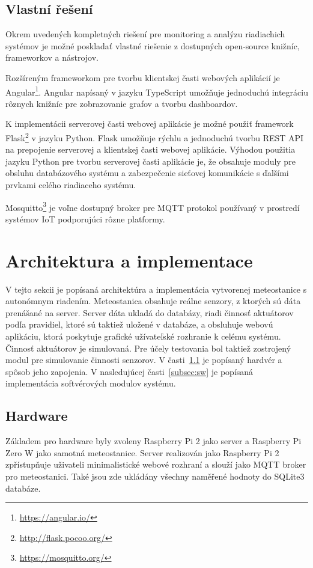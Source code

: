 \documentclass[11pt,a4paper]{article}
\begin{document}
\subsection{Vlastní řešení}
Okrem uvedených kompletných riešení pre monitoring a analýzu riadiachich systémov je možné poskladať vlastné riešenie
z dostupných open-source knižníc, frameworkov a nástrojov.

Rozšíreným frameworkom pre tvorbu klientskej časti webových aplikácií je Angular\footnote{\url{https://angular.io/}}.
Angular napísaný v jazyku TypeScript umožňuje jednoduchú integráciu rôznych knižníc pre zobrazovanie grafov a tvorbu dashboardov.

K implementácii serverovej časti webovej aplikácie je možné použiť framework Flask\footnote{\url{http://flask.pocoo.org/}} v jazyku Python.
Flask umožňuje rýchlu a jednoduchú tvorbu REST API na prepojenie serverovej a klientskej časti webovej aplikácie.
Výhodou použitia jazyku Python pre tvorbu serverovej časti aplikácie je, že obsahuje moduly pre obsluhu databázového systému
a zabezpečenie sieťovej komunikácie s ďalšími prvkami celého riadiaceho systému.

Mosquitto\footnote{\url{https://mosquitto.org/}} je voľne dostupný broker pre MQTT protokol používaný v prostredí systémov IoT podporujúci rôzne platformy.

\section{Architektura a implementace}
V tejto sekcii je popísaná architektúra a implementácia vytvorenej meteostanice s autonómnym riadením.
Meteostanica obsahuje reálne senzory, z ktorých sú dáta prenášané na server.
Server dáta ukladá do databázy, riadi činnosť aktuátorov podľa pravidiel, ktoré sú taktiež uložené v databáze,
a obsluhuje webovú aplikáciu, ktorá poskytuje grafické užívateľské rozhranie k celému systému.
Činnosť aktuátorov je simulovaná.
Pre účely testovania bol taktiež zostrojený modul pre simulovanie činnosti senzorov.
V časti~\ref{subsec:hw} je popísaný hardvér a spôsob jeho zapojenia.
V nasledujúcej časti~\ref{subsec:sw} je popísaná implementácia softvérových modulov systému.

\subsection{Hardware}\label{subsec:hw}
Základem pro hardware byly zvoleny Raspberry Pi 2 jako server a Raspberry Pi Zero W jako samotná meteostanice. Server realizován jako Raspberry Pi 2 zpřístupňuje uživateli minimalistické webové rozhraní a slouží jako MQTT broker pro meteostanici. Také jsou zde ukládány všechny naměřené hodnoty do SQLite3 databáze.
\end{document}
